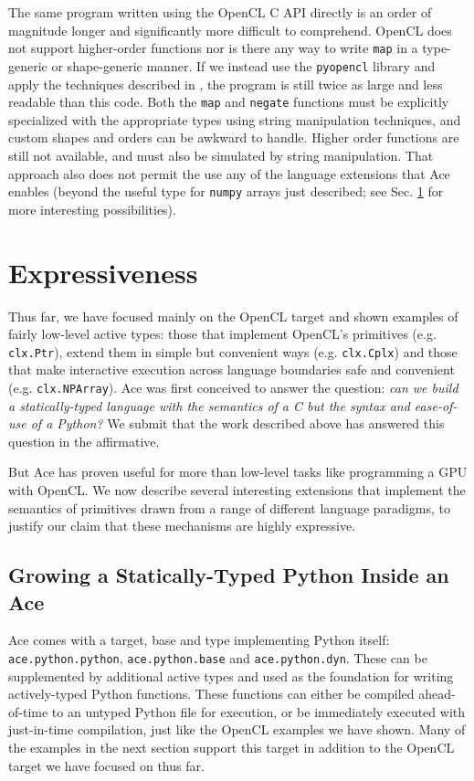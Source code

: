 \documentclass[10pt,preprint]{sigplanconf}
\begin{document}
{The same program written using the OpenCL C API directly is an order of magnitude longer and significantly more difficult to comprehend. OpenCL does not support higher-order functions nor is there any way to write \verb|map| in a type-generic or shape-generic manner. If we instead use the \verb|pyopencl| library and apply the techniques described in \cite{klockner2011pycuda}, the program is still twice as large and less readable than this code. Both the \verb|map| and \verb|negate| functions must be explicitly specialized with the appropriate types using string manipulation techniques, and custom shapes and orders can be awkward to handle. Higher order functions are still not available, and must also be simulated by string manipulation. That approach also does not permit the use any of the language extensions that Ace enables (beyond the useful type for \verb|numpy| arrays just described; see Sec. \ref{examples} for more interesting possibilities).


\section{Expressiveness}\label{examples}
Thus far, we have focused mainly on the OpenCL target and shown examples of fairly low-level active types: those that implement OpenCL's primitives (e.g. \verb|clx.Ptr|), extend them in simple but convenient ways (e.g. \verb|clx.Cplx|) and those that make interactive execution across language boundaries safe and convenient (e.g. \verb|clx.NPArray|). 
Ace was first conceived to answer the question: \emph{can we build a statically-typed language with the semantics of a C but the syntax and ease-of-use of a Python?} We submit that the work described above has answered this question in the affirmative. 

But Ace has proven useful for more than low-level tasks like programming a GPU with OpenCL. We now describe several interesting extensions that implement the semantics of primitives drawn from a range of different language paradigms, to justify our claim that these mechanisms are highly expressive. 

\subsection{Growing a Statically-Typed Python Inside an Ace}
Ace comes with a target, base and type implementing Python itself: \verb|ace.python.python|, \verb|ace.python.base| and \verb|ace.python.dyn|. These can be supplemented by additional active types and used as the foundation for writing actively-typed Python functions. These functions can either be compiled ahead-of-time to an untyped Python file for execution, or be immediately executed with just-in-time compilation, just like the OpenCL examples we have shown. Many of the examples in the next section support this target in addition to the OpenCL target we have focused on thus far.

}
\end{document}

